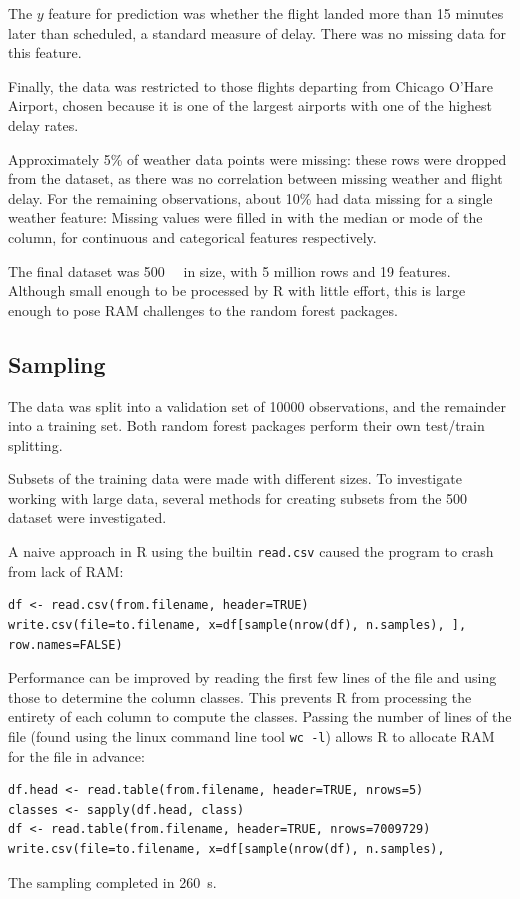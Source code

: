 \documentclass{article}
\begin{document}
The $y$ feature for prediction was whether the flight landed more than 15 minutes later than scheduled, a standard measure of delay. There was no missing data for this feature.

Finally, the data was restricted to those flights departing from Chicago O'Hare Airport, chosen because it is one of the largest airports with one of the highest delay rates.

Approximately 5\% of weather data points were missing: these rows were dropped from the dataset, as there was no correlation between missing weather and flight delay. For the remaining observations, about 10\% had data missing for a single weather feature: Missing values were filled in with the median or mode of the column, for continuous and categorical features respectively. 

The final dataset was \SI{500}{\mega\byte} in size, with 5 million rows and 19 features. Although small enough to be processed by R with little effort, this is large enough to pose RAM challenges to the random forest packages.


\subsection{Sampling}
The data was split into a validation set of 10000 observations, and the remainder into a training set. Both random forest packages perform their own test/train splitting.

Subsets of the training data were made with different sizes. To investigate working with large data, several methods for creating subsets from the \SI{500}{\mega\byte} dataset were investigated.

A naive approach in R using the builtin \texttt{read.csv} caused the program to crash from lack of RAM:
\begin{lstlisting}[frame=single, basicstyle=\footnotesize\ttfamily]
df <- read.csv(from.filename, header=TRUE)
write.csv(file=to.filename, x=df[sample(nrow(df), n.samples), ], row.names=FALSE)
\end{lstlisting}

Performance can be improved by reading the first few lines of the file and using those to determine the column classes. This prevents R from processing the entirety of each column to compute the classes. Passing the number of lines of the file (found using the linux command line tool \texttt{wc -l}) allows R to allocate RAM for the file in advance:
\begin{lstlisting}[frame=single, basicstyle=\footnotesize\ttfamily]
df.head <- read.table(from.filename, header=TRUE, nrows=5)
classes <- sapply(df.head, class)
df <- read.table(from.filename, header=TRUE, nrows=7009729)
write.csv(file=to.filename, x=df[sample(nrow(df), n.samples),
\end{lstlisting}
The sampling completed in \SI{260}{\second}.
\end{document}
